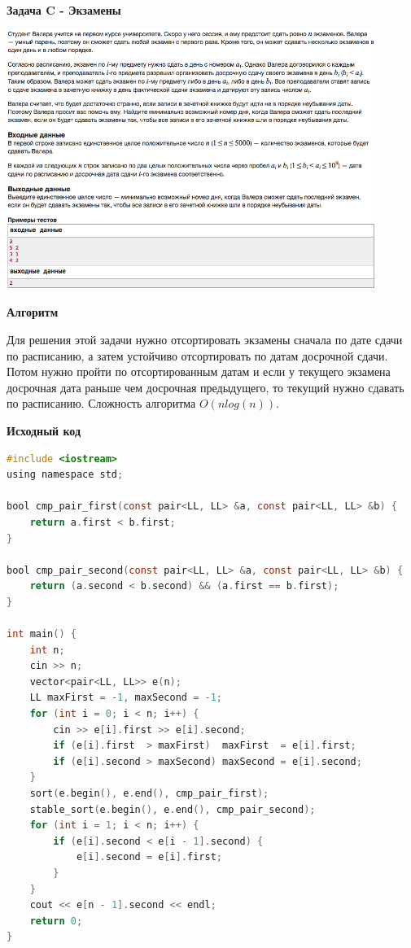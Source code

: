 \documentclass[a4paper,12pt]{article}
\begin{document}
\newpage
\textbf{{\large Задача C - Экзамены}}

\begin{center}
\includegraphics[width=0.9\textwidth]{C_274/C_274_C.png}\\ [1cm]
\end{center}

\textbf{{\large Алгоритм}}

Для решения этой задачи нужно отсортировать экзамены сначала по дате сдачи по расписанию, а затем устойчиво отсортировать по датам досрочной сдачи. Потом нужно пройти по отсортированным датам и если у текущего экзамена досрочная дата раньше чем досрочная предыдущего, то текущий нужно сдавать по расписанию. Сложность алгоритма $O(nlog(n))$.

\newpage
\textbf{{\large Исходный код}} \\
\begin{lstlisting}[language=C]
#include <iostream>
using namespace std;

bool cmp_pair_first(const pair<LL, LL> &a, const pair<LL, LL> &b) {
    return a.first < b.first;
}

bool cmp_pair_second(const pair<LL, LL> &a, const pair<LL, LL> &b) {
    return (a.second < b.second) && (a.first == b.first);
}

int main() {
    int n;
    cin >> n;
    vector<pair<LL, LL>> e(n);
    LL maxFirst = -1, maxSecond = -1;
    for (int i = 0; i < n; i++) {
        cin >> e[i].first >> e[i].second;
        if (e[i].first  > maxFirst)  maxFirst  = e[i].first;
        if (e[i].second > maxSecond) maxSecond = e[i].second;
    }
    sort(e.begin(), e.end(), cmp_pair_first);
    stable_sort(e.begin(), e.end(), cmp_pair_second);
    for (int i = 1; i < n; i++) {
        if (e[i].second < e[i - 1].second) {
            e[i].second = e[i].first;
        }
    }
    cout << e[n - 1].second << endl;
    return 0;
}
\end{lstlisting}
\end{document}
